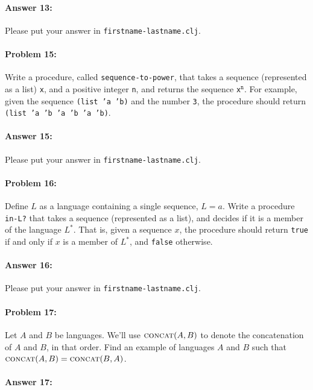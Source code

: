 \documentclass[10pt]{article}
\begin{document}
\paragraph{Answer 13:} Please put your answer in \texttt{firstname-lastname.clj}.

\hrulefill
\paragraph{Problem 15:}
Write a procedure, called \texttt{sequence-to-power}, that takes a
sequence (represented as a list) \texttt{x}, and a positive integer
\texttt{n}, and returns the sequence \texttt{x}$^\texttt{n}$. For
example, given the sequence \texttt{(list 'a 'b)} and the number
\texttt{3}, the procedure should return \texttt{(list 'a 'b 'a 'b 'a
  'b)}.

\paragraph{Answer 15:} Please put your answer in
\texttt{firstname-lastname.clj}.

\hrulefill
\paragraph{Problem 16:}
Define $L$ as a language containing a single sequence,
$L={a}$. Write a procedure \texttt{in-L?} that takes a sequence
(represented as a list), and decides if it is a member of the language
$L^*$. That is, given a sequence $x$, the procedure should return
\texttt{true} if and only if $x$ is a member of $L^*$, and
\texttt{false} otherwise.

\paragraph{Answer 16:} Please put your answer in
\texttt{firstname-lastname.clj}.

\hrulefill
\paragraph{Problem 17:}
Let $A$ and $B$ be languages. We'll use $\textsc{concat}(A,B)$ to
denote the concatenation of $A$ and $B$, in that order. Find an
example of languages $A$ and $B$ such that
$\textsc{concat}(A,B)=\textsc{concat}(B,A)$.

\paragraph{Answer 17:} 
\end{document}
